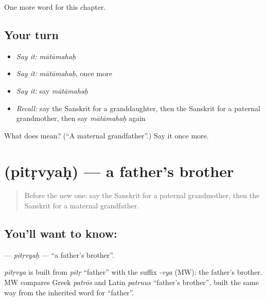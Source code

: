 \begin{grammarlens}[title={What you've built}]
One more word for this chapter.
\end{grammarlens}

\subsection*{Your turn}
\begin{itemize}
\raggedright
  \item \emph{Say it:} \emph{mātāmahaḥ}
  \item \emph{Say it:} \emph{mātāmahaḥ}, once more
  \item \emph{Say it:} say \emph{mātāmahaḥ}
  \item \emph{Recall:} say the Sanskrit for a granddaughter, then the Sanskrit for a paternal grandmother, then say \emph{mātāmahaḥ} again
\end{itemize}

\begin{tcolorbox}[breakable,colback=teal!4,colframe=teal!35!black,title={Before you move on}]
What does  mean? (\textquotedblleft{}A maternal grandfather\textquotedblright{}.) Say it once more.
\end{tcolorbox}
\section[\texorpdfstring{\sk{पितृव्यः} (pitṛvyaḥ)}{पितृव्यः (pitṛvyaḥ)}]{ (pitṛvyaḥ) — a father's brother}

\label{lesson:SA-C146-pitrvyah}



\begin{quote}
Before the new one: say the Sanskrit for a paternal grandmother, then the Sanskrit for a maternal grandfather.
\end{quote}

\subsection*{You'll want to know: }
\textbf{} — \emph{pitṛvyaḥ} — \textquotedblleft{}a father's brother\textquotedblright{}.

\begin{cousinweb}
\emph{pitṛvya} is built from \emph{pitṛ} \textquotedblleft{}father\textquotedblright{} with the suffix \emph{-vya} (MW): the father's brother. MW compares Greek \emph{patrōs} and Latin \emph{patruus} \textquotedblleft{}father's brother\textquotedblright{}, built the same way from the inherited word for \textquotedblleft{}father\textquotedblright{}.
\end{cousinweb}

